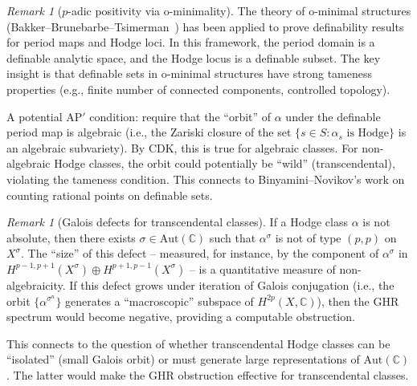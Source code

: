 \documentclass[aps,prd,twocolumn,superscriptaddress,nofootinbib]{revtex4-2}
\theoremstyle{definition}
\theoremstyle{remark}
\newtheorem{remark}[theorem]{Remark}
\begin{document}
\begin{remark}[$p$-adic positivity via o-minimality]
\label{rem:o-minimality}
The theory of o-minimal structures (Bakker--Brunebarbe--Tsimerman~\cite{BBT2020}) has been applied to prove definability results for period maps and Hodge loci. In this framework, the period domain is a definable analytic space, and the Hodge locus is a definable subset. The key insight is that definable sets in o-minimal structures have strong tameness properties (e.g., finite number of connected components, controlled topology).

A potential AP$'$ condition: require that the ``orbit'' of $\alpha$ under the definable period map is algebraic (i.e., the Zariski closure of the set $\{s \in S : \alpha_s \text{ is Hodge}\}$ is an algebraic subvariety). By CDK, this is true for algebraic classes. For non-algebraic Hodge classes, the orbit could potentially be ``wild'' (transcendental), violating the tameness condition. This connects to Binyamini--Novikov's work on counting rational points on definable sets.
\end{remark}

\begin{remark}[Galois defects for transcendental classes]
\label{rem:galois-defects}
If a Hodge class $\alpha$ is not absolute, then there exists $\sigma \in \mathrm{Aut}(\mathbb{C})$ such that $\alpha^\sigma$ is not of type $(p,p)$ on $X^\sigma$. The ``size'' of this defect -- measured, for instance, by the component of $\alpha^\sigma$ in $H^{p-1,p+1}(X^\sigma) \oplus H^{p+1,p-1}(X^\sigma)$ -- is a quantitative measure of non-algebraicity. If this defect grows under iteration of Galois conjugation (i.e., the orbit $\{\alpha^{\sigma^n}\}$ generates a ``macroscopic'' subspace of $H^{2p}(X, \mathbb{C})$), then the GHR spectrum would become negative, providing a computable obstruction.

This connects to the question of whether transcendental Hodge classes can be ``isolated'' (small Galois orbit) or must generate large representations of $\mathrm{Aut}(\mathbb{C})$. The latter would make the GHR obstruction effective for transcendental classes.
\end{remark}
\end{document}
